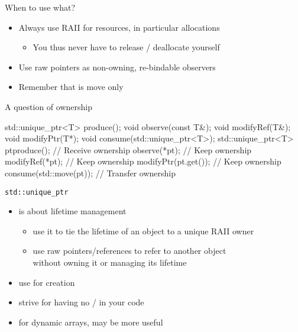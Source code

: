 \begin{frame}[fragile]
  \begin{block}{When to use what?}
    \begin{itemize}
    \item Always use RAII for resources, in particular allocations
    \begin{itemize}
      \item You thus never have to release / deallocate yourself
    \end{itemize}
    \item Use raw pointers as non-owning, re-bindable observers
    \item Remember that  is move only
    \end{itemize}
  \end{block}
  \pause
  \begin{exampleblock}{A question of ownership}
    \small
    \begin{cppcode*}{}
      std::unique_ptr<T> produce();
      void observe(const T&);
      void modifyRef(T&);
      void modifyPtr(T*);
      void consume(std::unique_ptr<T>);
      std::unique_ptr<T> pt{produce()}; // Receive ownership
      observe(*pt);                     // Keep ownership
      modifyRef(*pt);                   // Keep ownership
      modifyPtr(pt.get());              // Keep ownership
      consume(std::move(pt));           // Transfer ownership
    \end{cppcode*}
  \end{exampleblock}
\end{frame}

\begin{frame}[fragile]
  \begin{goodpractice}{\texttt{std::unique\_ptr}}
    \begin{itemize}
      \item {} is about lifetime management
      \begin{itemize}
        \item use it to tie the lifetime of an object to a unique RAII owner
        \item use raw pointers/references to refer to another object\\
              without owning it or managing its lifetime
      \end{itemize}
      \item use  for creation
      \item strive for having no / in your code
      \item for dynamic arrays,  may be more useful
    \end{itemize}
  \end{goodpractice}
\end{frame}

